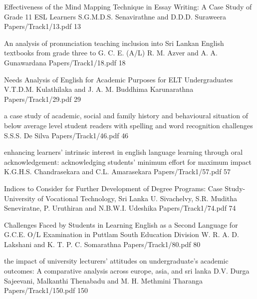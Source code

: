
%   		 
%   		 



\addpaper
	{Effectiveness of the Mind Mapping Technique in Essay Writing: A Case Study of Grade 11 ESL Learners}
	 {S.G.M.D.S. Senavirathne and D.D.D. Suraweera} 
	 {Papers/Track1/13.pdf}
    {13} 


  \addpaper
{An analysis of pronunciation teaching inclusion into Sri Lankan English textbooks from grade three to G. C. E. (A/L)}
 {R. M. Azver and A. A. Gunawardana} 
 {Papers/Track1/18.pdf}
   {18} 

  \addpaper
{Needs Analysis of English for Academic Purposes for ELT Undergraduates}
 {V.T.D.M. Kulathilaka and J. A. M. Buddhima Karunarathna} 
 {Papers/Track1/29.pdf}
   {29} 
 


\addpaper
{a case study of academic, social and family history and behavioural situation of below average level student readers with spelling and word recognition challenges}
{S.S.S. De Silva}
{Papers/Track1/46.pdf}
{46}




   \addpaper
{enhancing learners’ intrinsic interest in english language learning through oral acknowledgement: acknowledging students’ minimum effort for maximum impact}
 {K.G.H.S. Chandrasekara and C.L. Amarasekara} 
 {Papers/Track1/57.pdf}
   {57} 


\addpaper
{Indices to Consider for Further Development of Degree Programs: Case Study-University of Vocational Technology, Sri Lanka}
{U. Sivachelvy, S.R. Muditha Seneviratne, P. Uruthiran and N.B.W.I. Udeshika}
{Papers/Track1/74.pdf}
{74}


\addpaper
{Challenges Faced by Students in Learning English as a Second Language for G.C.E. O/L Examination in Puttlam South Education Division}
{W. R. A. D. Lakshani and K. T. P. C. Somarathna}
{Papers/Track1/80.pdf}
{80}


    \addpaper
{the impact of university lecturers' attitudes on
undergraduate’s academic outcomes: A
comparative analysis across europe, asia, and sri
lanka}
 {D.V. Durga Sajeevani, Malkanthi Thenabadu and M. H. Methmini Tharanga} 
 {Papers/Track1/150.pdf}
   {150} 


